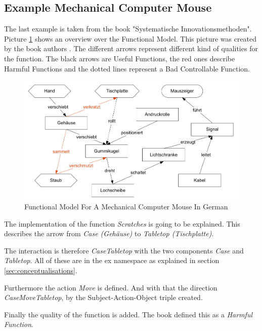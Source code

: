 \subsection{Example Mechanical Computer Mouse}

The last example is taken from the book "Systematische  Innovationsmethoden".
Picture \ref{fig:functional_model_mechanical_computer_mouse} shows an overview over the Functional Model. 
This picture was created by the book authors \cite{KS}.
The different arrows represent different kind of qualities for the function.
The black arrows are Useful Functions, the red ones describe Harmful Functions and the dotted lines represent a Bad Controllable Function.

\begin{figure}[H]
    \centering
    \includegraphics[scale=.6]{pictures/functional_model_mechanical_computer_mouse.png}
    \caption{Functional Model For A Mechanical Computer Mouse In German}
    \label{fig:functional_model_mechanical_computer_mouse}
\end{figure}

The implementation of the function \textit{Scratches} is going to be explained.
This describes the arrow from \textit{Case (Gehäuse)} to \textit{Tabletop (Tischplatte)}.

The interaction is therefore \textit{CaseTabletop} with the two components \textit{Case} and \textit{Tabletop}.
All of these are in the ex namespace as explained in section \ref{sec:conceptualisations}.

Furthermore the action \textit{Move} is defined. 
And with that the direction \textit{CaseMoveTabletop}, by the Subject-Action-Object triple created.

Finally the quality of the function is added.
The book defined this as a \textit{Harmful Function}.

